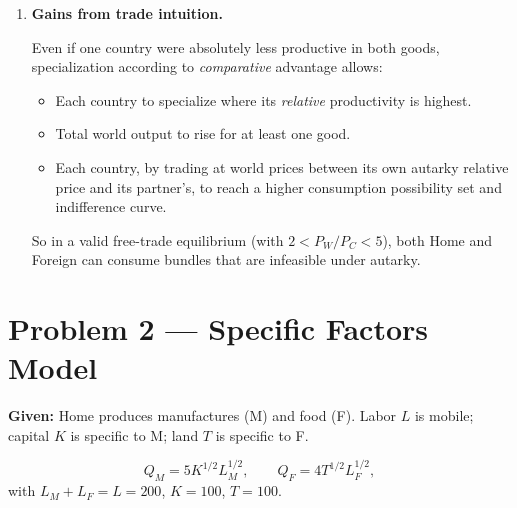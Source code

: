 \documentclass[12pt]{article}
\begin{document}
\begin{enumerate}[label=(\arabic*)]
\emph{Foreign:}
\[
\frac{P_W}{a_{LW}} = \frac{1.5}{5} = 0.3, \quad 
\frac{P_C}{a_{LC}} = \frac{1}{1} = 1.
\]
Again cloth yields higher returns; Foreign also specializes in cloth.

Thus, at $P_W/P_C = 1.5$:
\[
\boxed{\text{Both Home \emph{and} Foreign would specialize in cloth.}}
\]

This relative price is actually \emph{inconsistent} with trade equilibrium in the basic Ricardian model, because no one wants to produce wheat at such a low wheat price. In a consistent free-trade equilibrium, $P_W/P_C$ must satisfy:
\[
\frac{a_{LW}}{a_{LC}}\Big|_H < \frac{P_W}{P_C} < \frac{a_{LW}}{a_{LC}}\Big|_F
\Rightarrow 2 < \frac{P_W}{P_C} < 5.
\]
For example, if $P_W/P_C=3$, Home would specialize in wheat and Foreign in cloth, and trade would be feasible. The question’s price (1.5) is useful pedagogically to illustrate this inconsistency.

\item \textbf{Gains from trade intuition.}

Even if one country were absolutely less productive in both goods, specialization according to \emph{comparative} advantage allows:
\begin{itemize}
\item Each country to specialize where its \emph{relative} productivity is highest.
\item Total world output to rise for at least one good.
\item Each country, by trading at world prices between its own autarky relative price and its partner’s, to reach a higher consumption possibility set and indifference curve.
\end{itemize}

So in a valid free-trade equilibrium (with $2 < P_W/P_C < 5$), both Home and Foreign can consume bundles that are infeasible under autarky.

\end{enumerate}

\section*{Problem 2 — Specific Factors Model}

\textbf{Given:}  
Home produces manufactures (M) and food (F). Labor $L$ is mobile; capital $K$ is specific to M; land $T$ is specific to F.

\[
Q_M = 5K^{1/2}L_M^{1/2}, \qquad Q_F = 4T^{1/2}L_F^{1/2},
\]
with $L_M + L_F = L = 200$, $K = 100$, $T = 100$.
\end{document}
